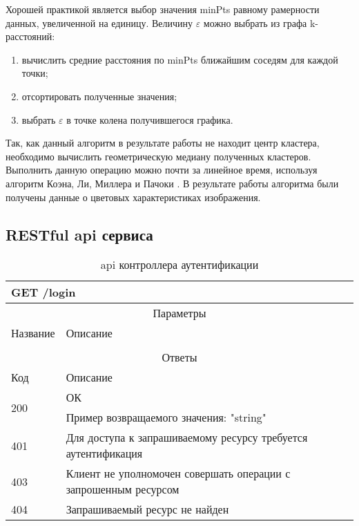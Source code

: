 Хорошей практикой является выбор значения minPts равному рамерности данных, увеличенной на единицу.
Величину \(\mathcal{\varepsilon}\) можно выбрать из графа k-расстояний\cite{k-graph}:
\begin{enumerate}
    \item вычислить средние расстояния по minPts ближайшим соседям для каждой точки;
    \item отсортировать полученные значения;
    \item выбрать \(\mathcal{\varepsilon}\) в точке колена получившегося графика.
\end{enumerate}

Так, как данный алгоритм в результате работы не находит центр кластера, необходимо вычислить геометрическую медиану полученных кластеров.
Выполнить данную операцию можно почти за линейное время, используя алгоритм Коэна, Ли, Миллера и Пачоки \cite{median-linear}.
В результате работы алгоритма были получены данные о цветовых характеристиках изображения.

\subsection{RESTful api сервиса}

\begin{table}[H]
  \caption{api контроллера аутентификации}\label{api-auth-table}
  \begin{tabular}{|p{6cm}|p{10cm}|}
  \hline \multicolumn{2}{|l|}{GET /login} \\
  \hline \multicolumn{2}{|c|}{Параметры} \\
  \hline Название & Описание \\
  \hline  &  \\
  \hline \multicolumn{2}{|c|}{Ответы} \\
  \hline Код & Описание \\
  \hline \multirow{2}{=}{200} & ОК \\
   & Пример возвращаемого значения: "string"\\
  \hline 401 & Для доступа к запрашиваемому ресурсу требуется аутентификация \\
  \hline 403 & Клиент не уполномочен совершать операции с запрошенным ресурсом \\
  \hline 404 & Запрашиваемый ресурс не найден \\
  \hline
  \end{tabular}
\end{table}

